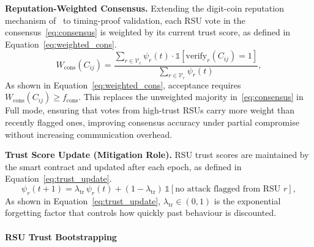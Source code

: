 \textbf{Reputation-Weighted Consensus.}
Extending the digit-coin reputation mechanism
of~\cite{alkhamisi2024bcs} to timing-proof validation,
each RSU vote in the consensus~\eqref{eq:consensus}
is weighted by its current trust score, as defined in
Equation~\eqref{eq:weighted_cons}.
\begin{equation}
W_{\mathrm{cons}}(C_{ij}) =
  \frac{\sum_{r\in\mathcal{V}_r}
    \psi_r(t)\cdot\mathbb{1}[\mathrm{verify}_r(C_{ij})=1]}
  {\sum_{r\in\mathcal{V}_r}\psi_r(t)},
\label{eq:weighted_cons}
\end{equation}
As shown in Equation~\eqref{eq:weighted_cons}, acceptance
requires $W_{\mathrm{cons}}(C_{ij}) \geq f_{\mathrm{cons}}$. This replaces the unweighted
majority in~\eqref{eq:consensus} in Full mode,
ensuring that votes from high-trust RSUs carry
more weight than recently flagged ones, improving
consensus accuracy under partial compromise without
increasing communication overhead.

\textbf{Trust Score Update (Mitigation Role).}
RSU trust scores are maintained by the smart contract and updated
after each epoch, as defined in Equation~\eqref{eq:trust_update}.
\begin{equation}
\psi_r(t{+}1) =
  \lambda_{\mathrm{tr}}\,\psi_r(t) +
  (1-\lambda_{\mathrm{tr}})\,
  \mathbb{1}[\text{no attack flagged from RSU }r],
\label{eq:trust_update}
\end{equation}
As shown in Equation~\eqref{eq:trust_update},
$\lambda_{\mathrm{tr}}\in(0,1)$ is the exponential forgetting
factor that controls how quickly past behaviour is discounted. 

\paragraph{RSU Trust Bootstrapping}
\label{sec:trust_bootstrap}

